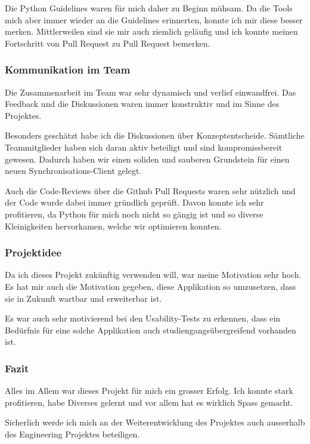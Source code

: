 \documentclass[a4paper]{article}
\begin{document}
  Die Python Guidelines waren für mich daher zu Beginn mühsam.
  Da die Tools mich aber immer wieder an die Guidelines erinnerten, konnte ich mir diese besser merken.
  Mittlerweilen sind sie mir auch ziemlich geläufig und ich konnte meinen Fortschritt von Pull Request zu Pull Request bemerken.

  \subsubsection{Kommunikation im Team}

  Die Zusammenarbeit im Team war sehr dynamisch und verlief einwandfrei.
  Das Feedback und die Diskussionen waren immer konstruktiv und im Sinne des Projektes.

  Besonders geschätzt habe ich die Diskussionen über Konzeptentscheide.
  Sämtliche Teammitglieder haben sich daran aktiv beteiligt und sind kompromissbereit gewesen.
  Dadurch haben wir einen soliden und sauberen Grundstein für einen neuen Synchronisations-Client gelegt.

  Auch die Code-Reviews über die Github Pull Requests waren sehr nützlich und der Code wurde dabei immer gründlich geprüft.
  Davon konnte ich sehr profitieren, da Python für mich noch nicht so gängig ist und so diverse Kleinigkeiten hervorkamen, welche wir optimieren konnten.

  \subsubsection{Projektidee}

  Da ich dieses Projekt zukünftig verwenden will, war meine Motivation sehr hoch.
  Es hat mir auch die Motivation gegeben, diese Applikation so umzusetzen, dass sie in Zukunft wartbar und erweiterbar ist.

  Es war auch sehr motivierend bei den Usability-Tests zu erkennen, dass ein Bedürfnis für eine solche Applikation auch studiengangsübergreifend vorhanden ist.

  \subsubsection{Fazit}

  Alles im Allem war dieses Projekt für mich ein grosser Erfolg.
  Ich konnte stark profitieren, habe Diverses gelernt und vor allem hat es wirklich Spass gemacht.

  Sicherlich werde ich mich an der Weiterentwicklung des Projektes auch ausserhalb des Engineering Projektes beteiligen.
\end{document}
